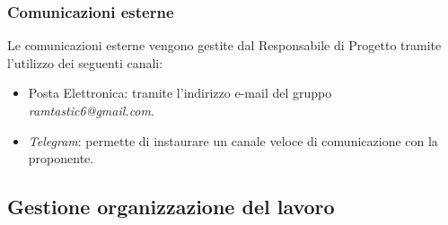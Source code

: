 \documentclass[12pt, oneside]{article}
\begin{document}
\subsubsection{Comunicazioni esterne}
Le comunicazioni esterne vengono gestite dal Responsabile di Progetto tramite l’utilizzo dei seguenti
canali:
\begin{itemize}
    \item  Posta Elettronica: tramite l’indirizzo e-mail del gruppo \textit{ramtastic6@gmail.com}.
    \item  \textit{Telegram}: permette di instaurare un canale veloce di comunicazione con la proponente.
\end{itemize}

\subsection{Gestione organizzazione del lavoro}
\end{document}
